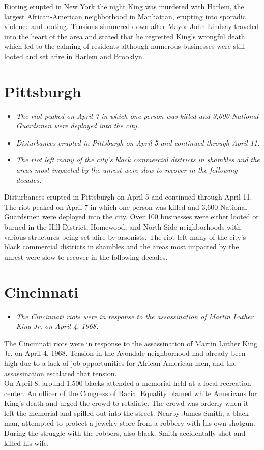 Rioting erupted in New York the night King was murdered with Harlem, the
largest African-American neighborhood in Manhattan, erupting into
sporadic violence and looting. Tensions simmered down after Mayor John
Lindsay traveled into the heart of the area and stated that he regretted
King's wrongful death which led to the calming of residents although
numerous businesses were still looted and set afire in Harlem and
Brooklyn.

\section{Pittsburgh}\label{pittsburgh}

\begin{itemize}
\item
  \emph{The riot peaked on April 7 in which one person was killed and
  3,600 National Guardsmen were deployed into the city.}
\item
  \emph{Disturbances erupted in Pittsburgh on April 5 and continued
  through April 11.}
\item
  \emph{The riot left many of the city's black commercial districts in
  shambles and the areas most impacted by the unrest were slow to
  recover in the following decades.}
\end{itemize}

Disturbances erupted in Pittsburgh on April 5 and continued through
April 11. The riot peaked on April 7 in which one person was killed and
3,600 National Guardsmen were deployed into the city. Over 100
businesses were either looted or burned in the Hill District, Homewood,
and North Side neighborhoods with various structures being set afire by
arsonists. The riot left many of the city's black commercial districts
in shambles and the areas most impacted by the unrest were slow to
recover in the following decades.

\section{Cincinnati}\label{cincinnati}

\begin{itemize}
\item
  \emph{The Cincinnati riots were in response to the assassination of
  Martin Luther King Jr. on April 4, 1968.}
\end{itemize}

The Cincinnati riots were in response to the assassination of Martin
Luther King Jr. on April 4, 1968. Tension in the Avondale neighborhood
had already been high due to a lack of job opportunities for
African-American men, and the assassination escalated that tension.\\
On April 8, around 1,500 blacks attended a memorial held at a local
recreation center. An officer of the Congress of Racial Equality blamed
white Americans for King's death and urged the crowd to retaliate. The
crowd was orderly when it left the memorial and spilled out into the
street. Nearby James Smith, a black man, attempted to protect a jewelry
store from a robbery with his own shotgun. During the struggle with the
robbers, also black, Smith accidentally shot and killed his wife.


